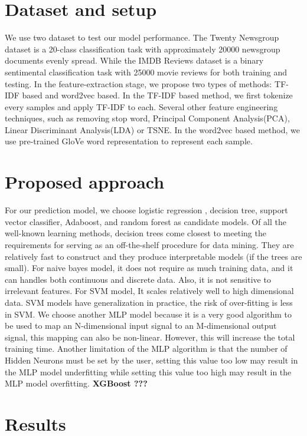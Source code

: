 \documentclass[11pt]{scrartcl}
\begin{document}
\section{Dataset and setup}
We use two dataset to test our model performance. The Twenty Newsgroup dataset is a 20-class classification task with approximately 20000 newsgroup documents evenly spread\cite{Lang95}. While the IMDB Reviews dataset is a binary sentimental classification task with 25000 movie reviews for both training and testing\cite{maas-EtAl:2011:ACL-HLT2011}. In the feature-extraction stage, we propose two types of methods: TF-IDF based and word2vec based. In the TF-IDF based method, we first tokenize every samples and apply TF-IDF to each. Several other feature engineering techniques, such as removing stop word, Principal Component Analysis(PCA), Linear Discriminant Analysis(LDA) or TSNE. In the word2vec based method, we use pre-trained GloVe\cite{pennington2014glove} word representation to represent each sample.

\section{Proposed approach}
For our prediction model, we choose logistic regression , decision tree, support vector classifier, Adaboost, and random forest as candidate models. Of all the well-known learning methods, decision trees come closest to meeting the requirements for serving as an off-the-shelf procedure for data mining. They are relatively fast to construct and they produce interpretable models (if the trees are small). For naive bayes model, it does not require as much training data, and it can handles both continuous and discrete data. Also, it is not sensitive to irrelevant features. For SVM model, It scales relatively well to high dimensional data. SVM models have generalization in practice, the risk of over-fitting is less in SVM. We choose another MLP model because it is a very good algorithm to be used to map an N-dimensional input signal to an M-dimensional output signal, this mapping can also be non-linear.  However, this will increase the total training time. Another limitation of the MLP algorithm is that the number of Hidden Neurons must be set by the user, setting this value too low may result in the MLP model underfitting while setting this value too high may result in the MLP model overfitting. \textbf{XGBoost ???}

\section{Results}
\end{document}
